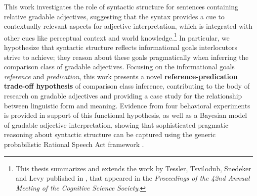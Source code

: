 This work investigates the role of syntactic structure for sentences containing relative gradable adjectives, suggesting that the syntax provides a cue to contextually relevant aspects for adjective interpretation, which is integrated with other cues like perceptual context and world knowledge.\footnote{This thesis summarizes and extends the work by Tessler, Tsvilodub, Snedeker and Levy published in \textcite{tessler2020}, that appeared in the \textit{Proceedings of the 42nd Annual Meeting of the Cognitive Science Society}.} In particular, we hypothesize that syntactic structure reflects informational goals interlocutors strive to achieve; they reason about these goals pragmatically when inferring the comparison class of gradable adjectives. Focusing on the informational goals \textit{reference} and \textit{predication}, this work presents a novel \textbf{reference-predication trade-off hypothesis} of comparison class inference, contributing to the body of research on gradable adjectives and providing a case study for the relationship between linguistic form and meaning. Evidence from four behavioral experiments is provided in support of this functional hypothesis, as well as a Bayesian model of gradable adjective interpretation, showing that sophisticated pragmatic reasoning about syntactic structure can be captured using the generic probabilistic Rational Speech Act framework \parencite{goodman2016}. 
	
